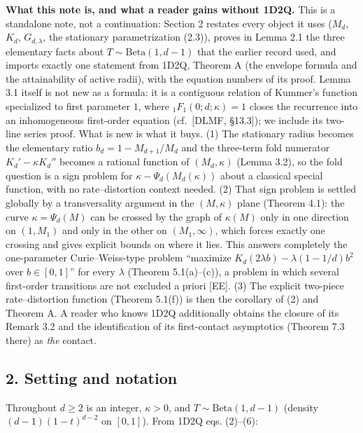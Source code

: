 \documentclass[
  11pt,
  a4paper,
]{article}
\begin{document}
\textbf{What this note is, and what a reader gains without 1D2Q.} This
is a standalone note, not a continuation: Section 2 restates every
object it uses (\(M_d\), \(K_d\), \(G_{d,\allowbreak{}\lambda}\), the stationary
parametrization (2.3)), proves in Lemma 2.1 the three elementary facts
about \(T\sim\mathrm{Beta}(1,\allowbreak{}d-1)\) that the earlier record used, and
imports exactly one statement from 1D2Q, Theorem A (the envelope formula
and the attainability of active radii), with the equation numbers of its
proof. Lemma 3.1 itself is not new as a formula: it is a contiguous
relation of Kummer's function specialized to first parameter \(1\),
where \({}_1F_1(0;\allowbreak{}d;\allowbreak{}\kappa)=1\) closes the recurrence into an
inhomogeneous first-order equation (cf.~{[}DLMF, §13.3{]}); we include
its two-line series proof. What is new is what it buys. (1) The
stationary radius becomes the elementary ratio \(b_d=1-M_{d+1}/M_d\) and
the three-term fold numerator \(K_d'-\kappa K_d''\) becomes a rational
function of \((M_d,\allowbreak{}\kappa)\) (Lemma 3.2), so the fold question is a sign
problem for \(\kappa-\Psi_d(M_d(\kappa))\) about a classical special
function, with no rate--distortion context needed. (2) That sign problem
is settled globally by a transversality argument in the \((M,\allowbreak{}\kappa)\)
plane (Theorem 4.1): the curve \(\kappa=\Psi_d(M)\) can be crossed by
the graph of \(\kappa(M)\) only in one direction on \((1,\allowbreak{}M_1)\) and only
in the other on \((M_1,\allowbreak{}\infty)\), which forces exactly one crossing and
gives explicit bounds on where it lies. This answers completely the
one-parameter Curie--Weiss-type problem ``maximize
\(K_d(2\lambda b)-\lambda(1-1/d)b^2\) over \(b\in[0,\allowbreak{}1]\)'' for every
\(\lambda\) (Theorem 5.1(a)--(c)), a problem in which several
first-order transitions are not excluded a priori {[}EE{]}. (3) The
explicit two-piece rate--distortion function (Theorem 5.1(f)) is then
the corollary of (2) and Theorem A. A reader who knows 1D2Q additionally
obtains the closure of its Remark 3.2 and the identification of its
first-contact asymptotics (Theorem 7.3 there) as \emph{the} contact.

\subsection{2. Setting and notation}\label{setting-and-notation}

Throughout \(d\ge2\) is an integer, \(\kappa>0\), and
\(T\sim\mathrm{Beta}(1,\allowbreak{}d-1)\) (density \((d-1)(1-t)^{d-2}\) on
\([0,\allowbreak{}1]\)). From 1D2Q eqs. (2)--(6):
\end{document}
